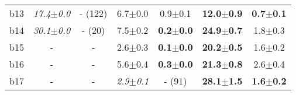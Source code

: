 \begin{longtable}{|l|c|c|c|c|c|c|}
\\
b13&\textit{17.4$\pm$0.0} & - (122)&6.7$\pm$0.0 & 0.9$\pm$0.1&\textbf{12.0$\pm$0.9} & \textbf{0.7$\pm$0.1}
\\
b14&\textit{30.1$\pm$0.0} & - (20)&7.5$\pm$0.2 & \textbf{0.2$\pm$0.0}&\textbf{24.9$\pm$0.7} & 1.8$\pm$0.3
\\
b15&- & -&2.6$\pm$0.3 & \textbf{0.1$\pm$0.0}&\textbf{20.2$\pm$0.5} & 1.6$\pm$0.2
\\
b16&- & -&5.6$\pm$0.4 & \textbf{0.3$\pm$0.0}&\textbf{21.3$\pm$0.8} & 2.6$\pm$0.4
\\
b17&- & -&\textit{2.9$\pm$0.1} & - (91)&\textbf{28.1$\pm$1.5} & \textbf{1.6$\pm$0.2}
\\
\hline
\end{longtable}

